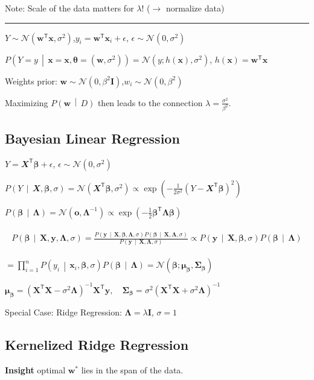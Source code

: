 \documentclass[a4paper,10pt,twoside]{extarticle}
\newcommand{\cN}{\mathcal{N}}
\newcommand{\cProb}[2]{P\left( #1 \,\middle|\, #2 \right)}
\newcommand{\rY}{Y}
\newcommand{\rvX}{\mathbfit{X}}
\newcommand*{\T}{\mathsf{T}}
\newcommand{\mat}[1]{\mathbf{#1}}
\renewcommand{\vec}[1]{\mathbf{#1}}
\newcommand{\vo}{\vec{o}}
\newcommand{\vw}{\vec{w}}
\newcommand{\vx}{\vec{x}}
\newcommand{\vy}{\vec{y}}
\newcommand{\vbeta}{\boldsymbol{\beta}}
\newcommand{\vtheta}{\boldsymbol{\theta}}
\newcommand{\vmu}{\boldsymbol{\mu}}
\newcommand{\MI}{\mat{I}}
\newcommand{\MX}{\mat{X}}
\newcommand{\MLambda}{\mat{\Lambda}}
\newcommand{\MSigma}{\mat{\Sigma}}
\newcommand{\sep}{\vspace{0pt}\noindent\hrule\vspace{0pt}}
\begin{document}
\begin{landscape}
\begin{multicols*}{3}
Note: Scale of the data matters for $\lambda$! ($\rightarrow$ normalize
data)

\sep

$Y\sim\cN(\vw^\T\vx,\sigma^2)$,\quad $y_i=\vw^\T\vx_i+\epsilon$, \quad
$\epsilon\sim\cN(0,\sigma^2)$

$\cProb{Y=y}{\vx=\vx,\vtheta=(\vw,\sigma^2)}=\cN(y;h(\vx),\sigma^2)$,  
$h(\vx)=\vw^\T\vx$

Weights prior:
$\vw\sim\cN(0,\beta^2\MI)$,\quad $w_i\sim\cN(0,\beta^2)$

Maximizing $\cProb{\vw}{D}$ then leads to the connection
$\lambda=\frac{\sigma^2}{\beta^2}$.

\subsection{Bayesian Linear Regression}

$
\rY=\rvX^\T\vbeta+\epsilon$, $\epsilon\sim\cN(0,\sigma^2)
$

$
\cProb{Y}{\rvX,\vbeta,\sigma}=\cN(\rvX^\T\vbeta,\sigma^2)
\propto\exp\left(-\frac{1}{2\sigma^2}(\rY-\rvX^\T\vbeta)^2\right)
$

$
\cProb{\vbeta}{\MLambda}=\cN(\vo,\MLambda^{-1})
\propto
\exp\left(-\frac{1}{2}\vbeta^\T\MLambda\vbeta\right)
$

\begin{gather*}
\begin{align*}
\cProb{\vbeta}{\MX,\vy,\MLambda,\sigma}
=
\frac{\cProb{\vy}{\MX,\vbeta,\MLambda,\sigma}\cProb{\vbeta}{\MX,\MLambda,\sigma}}{
\cProb{\vy}{\MX,\MLambda,\sigma}}
\propto
\cProb{\vy}{\MX,\vbeta,\sigma}\cProb{\vbeta}{\MLambda}
\end{align*}
\end{gather*}

$
=\prod_{i=1}^n\cProb{y_i}{\vx_i,\vbeta,\sigma}\cProb{\vbeta}{\MLambda}
=\cN(\vbeta;\vmu_{\vbeta},\MSigma_{\vbeta})
$

$
\vmu_{\vbeta}=\left(\MX^\T\MX-\sigma^2\MLambda\right)^{-1}\MX^\T\vy,\quad
\MSigma_{\vbeta}=\sigma^2\left(\MX^\T\MX+\sigma^2\MLambda\right)^{-1}
$

Special Case: Ridge Regression: $\MLambda=\lambda\MI$, $\sigma=1$

\subsection{Kernelized Ridge Regression}

\textbf{Insight} optimal $\vw^*$ lies in the span of the data.


\end{multicols*}
\end{landscape}
\end{document}
